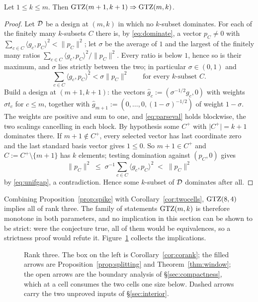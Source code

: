 \begin{proposition}[Lean]\label{prop:spike}
Let $1\le k\le m$.  Then $\mathrm{GTZ}(m+1,k+1)\Rightarrow\mathrm{GTZ}(m,k)$.
\end{proposition}

\begin{proof}
Let $\mathcal{D}$ be a design at $(m,k)$ in which no $k$-subset dominates.  For each
of the finitely many $k$-subsets $C$ there is, by \eqref{eq:dominate}, a
vector $p_C\ne0$ with $\sum_{c\in C}\langle g_c,p_C\rangle^2<\lVert
p_C\rVert^2$; let $\sigma$ be the average of $1$ and the largest of the
finitely many ratios $\sum_{c\in C}\langle g_c,p_C\rangle^2/\lVert
p_C\rVert^2$.  Every ratio is below $1$, hence so is their maximum, and
$\sigma$ lies strictly between the two; in particular $\sigma\in(0,1)$ and
\begin{equation}\label{eq:unifgap}
  \sum_{c\in C}\langle g_c,p_C\rangle^2<\sigma\lVert p_C\rVert^2
  \qquad\text{for every $k$-subset }C .
\end{equation}
Build a design at $(m+1,k+1)$: the vectors
$\hat g_c:=(\sigma^{-1/2}g_c,0)$ with weights $\sigma t_c$ for $c\le m$,
together with $\hat g_{m+1}:=(0,\dots,0,(1-\sigma)^{-1/2})$ of weight
$1-\sigma$.  The weights are positive and sum to one, and
\eqref{eq:parseval} holds blockwise, the two scalings cancelling in each
block.  By hypothesis some $C^{+}$ with $\lvert C^{+}\rvert=k+1$ dominates there.
If $m+1\notin C^{+}$,
every selected vector has last coordinate zero and the last standard basis
vector gives $1\le0$.  So $m+1\in C^{+}$ and $C:=C^{+}\setminus\{m+1\}$ has $k$
elements; testing domination against $(p_C,0)$ gives
\[
  \lVert p_C\rVert^2\;\le\;\sigma^{-1}\sum_{c\in C}\langle
  g_c,p_C\rangle^2\;<\;\lVert p_C\rVert^2
\]
by \eqref{eq:unifgap}, a contradiction.  Hence some $k$-subset of $\mathcal{D}$
dominates after all.
\end{proof}

Combining Proposition~\ref{prop:spike} with Corollary~\ref{cor:twocells},
$\mathrm{GTZ}(8,4)$ implies all of rank three.  The family of statements
$\mathrm{GTZ}(m,k)$ is therefore monotone in both parameters, and no implication
in this section can be shown to be strict: were the conjecture true, all
of them would be equivalences, so a strictness proof would refute it.
Figure~\ref{fig:ladder} collects the implications.

\begin{figure}[ht]
  \centering
  
  \caption{Rank three.  The box on the left is
  Corollary~\ref{cor:corank}; the filled arrows are
  Proposition~\ref{prop:splitting} and Theorem~\ref{thm:window}; the open
  arrows are the boundary analysis of \S\ref{sec:compactness}, which at a
  cell consumes the two cells one size below.  Dashed arrows carry the
  two unproved inputs of \S\ref{sec:interior}.}
  \label{fig:ladder}
\end{figure}
